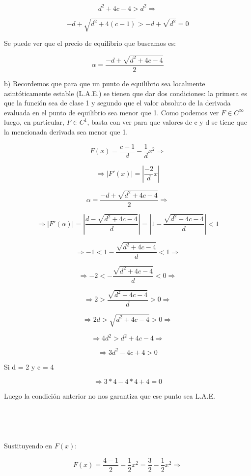 \documentclass[11pt, a4paper]{article}
\newif\IfInSansMode
\theoremstyle{theorem-style}
\theoremstyle{definition-style}
\theoremstyle{remark-style}
\theoremstyle{example-style}
\begin{document}
    \[
        d^{2} +4c-4 > d^{2} \Rightarrow 
    \]

    \[
        -d + \sqrt{d^2 +4(c-1)} > -d + \sqrt{d^{2}} = 0
    \]

    Se puede ver que el precio de equilibrio que buscamos es:

    \[
        \alpha = \frac{-d+\sqrt{d^{2} +4c-4}}{2}
    \]

    b) 
    Recordemos que para que un punto de equilibrio sea localmente asintóticamente estable (L.A.E.) se tienen que dar dos condiciones: la primera es que la funci\'on sea de clase 1 y segundo que el valor absoluto de la derivada evaluada en el punto de equilibrio sea menor que 1. Como podemos ver $F \in C^{\infty}$ luego, en particular, $F \in C^{1}$, basta con ver para que valores de c y d se tiene que la mencionada derivada sea menor que 1.

    \[
        F(x) = \frac{c-1}{d} - \frac{1}{d}x^{2} \Rightarrow
    \]

    \[
        \Rightarrow |F'(x)| = |\frac{-2}{d}x| 
    \]

    \[
        \alpha = \frac{-d+\sqrt{d^{2} +4c-4}}{2} \Rightarrow
    \]

    \[
        \Rightarrow |F'(\alpha)| = |\frac{d-\sqrt{d^{2}+4c-4}}{d}| = | 1 - \frac {\sqrt{d^{2}+4c-4}}{d}| < 1
    \]

    \[
        \Rightarrow -1 <  1 - \frac {\sqrt{d^{2}+4c-4}}{d} < 1 \Rightarrow
    \]

    \[
        \Rightarrow -2 < - \frac {\sqrt{d^{2}+4c-4}}{d} < 0 \Rightarrow
    \]

    \[
        \Rightarrow 2 > \frac {\sqrt{d^{2}+4c-4}}{d} > 0 \Rightarrow
    \]

    \[
        \Rightarrow 2d > \sqrt{d^{2}+4c-4} > 0 \Rightarrow
    \]

    \[
        \Rightarrow 4d^{2} > d^{2}+4c-4 \Rightarrow 
    \]

    \[
        \Rightarrow 3d^{2}-4c+4 > 0
    \]

    Si d = 2 y c = 4

    \[
        \Rightarrow 3*4 - 4*4 +4 = 0 
    \]

    Luego la condici\'on anterior no nos garantiza que ese punto sea L.A.E.
    \

    \

    \

    Sustituyendo en $F(x)$:

    \[
        F(x) = \frac{4-1}{2} - \frac{1}{2}x^{2} = \frac{3}{2} - \frac{1}{2}x^{2}\Rightarrow
    \]
\end{document}
